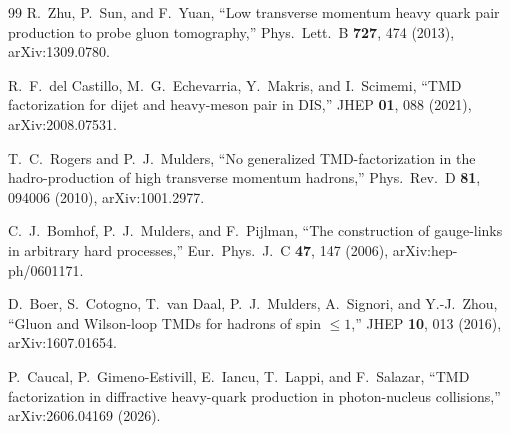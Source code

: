 \documentclass[11pt]{article}
\begin{document}
\begin{thebibliography}{99}
R.~Zhu, P.~Sun, and F.~Yuan,
``Low transverse momentum heavy quark pair production to probe gluon tomography,''
Phys.\ Lett.\ B \textbf{727}, 474 (2013), arXiv:1309.0780.

R.~F.~del Castillo, M.~G.~Echevarria, Y.~Makris, and I.~Scimemi,
``TMD factorization for dijet and heavy-meson pair in DIS,''
JHEP \textbf{01}, 088 (2021), arXiv:2008.07531.

T.~C.~Rogers and P.~J.~Mulders,
``No generalized TMD-factorization in the hadro-production of high transverse momentum hadrons,''
Phys.\ Rev.\ D \textbf{81}, 094006 (2010), arXiv:1001.2977.

C.~J.~Bomhof, P.~J.~Mulders, and F.~Pijlman,
``The construction of gauge-links in arbitrary hard processes,''
Eur.\ Phys.\ J.\ C \textbf{47}, 147 (2006), arXiv:hep-ph/0601171.

D.~Boer, S.~Cotogno, T.~van Daal, P.~J.~Mulders, A.~Signori, and Y.-J.~Zhou,
``Gluon and Wilson-loop TMDs for hadrons of spin \(\leq1\),''
JHEP \textbf{10}, 013 (2016), arXiv:1607.01654.

P.~Caucal, P.~Gimeno-Estivill, E.~Iancu, T.~Lappi, and F.~Salazar,
``TMD factorization in diffractive heavy-quark production in photon-nucleus collisions,''
arXiv:2606.04169 (2026).

\end{thebibliography}
\end{document}
